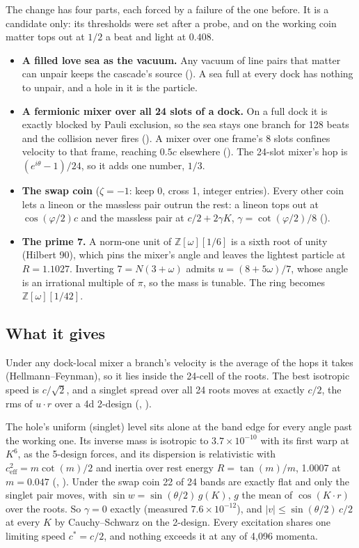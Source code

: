 The change has four parts, each forced by a failure of the one before. It is a candidate only: its thresholds were
set after a probe, and on the working coin matter tops out at $1/2$ a beat and light at $0.408$.
\begin{itemize}
\item \textbf{A filled love sea as the vacuum.} Any vacuum of line pairs that matter can unpair keeps the cascade's
source (). A sea full at every dock has nothing to unpair, and a hole in it is the particle.
\item \textbf{A fermionic mixer over all 24 slots of a dock.} On a full dock it is exactly blocked by Pauli exclusion,
so the sea stays one branch for 128 beats and the collision never fires (). A mixer over one frame's
8 slots confines velocity to that frame, reaching $0.5c$ elsewhere (). The 24-slot mixer's hop is
$(e^{i\theta} - 1)/24$, so it adds one number, $1/3$.
\item \textbf{The swap coin} ($\zeta = -1$: keep 0, cross 1, integer entries). Every other coin lets a lineon or the
massless pair outrun the rest: a lineon tops out at $\cos(\varphi/2)c$ and the massless pair at $c/2 + 2\gamma K$,
$\gamma = \cot(\varphi/2)/8$ ().
\item \textbf{The prime 7.} A norm-one unit of $\mathbb{Z}[\omega][1/6]$ is a sixth root of unity (Hilbert 90), which
pins the mixer's angle and leaves the lightest particle at $R = 1.1027$. Inverting $7 = N(3 + \omega)$ admits
$u = (8 + 5\omega)/7$, whose angle is an irrational multiple of $\pi$, so the mass is tunable. The ring becomes
$\mathbb{Z}[\omega][1/42]$.
\end{itemize}

\subsection{What it gives}

\begin{theorem}
Under any dock-local mixer a branch's velocity is the average of the hops it takes (Hellmann--Feynman), so it lies
inside the 24-cell of the roots. The best isotropic speed is $c/\sqrt2$, and a singlet spread over all 24 roots moves
at exactly $c/2$, the rms of $u \cdot r$ over a 4d 2-design (, ).
\end{theorem}

The hole's uniform (singlet) level sits alone at the band edge for every angle past the working one. Its inverse mass
is isotropic to $3.7 \times 10^{-10}$ with its first warp at $K^6$, as the 5-design forces, and its dispersion is
relativistic with $c_\text{eff}^2 = m \cot(m)/2$ and inertia over rest energy $R = \tan(m)/m$, 1.0007 at $m = 0.047$
(, ). Under the swap coin 22 of 24 bands are exactly flat and only the singlet
pair moves, with $\sin w = \sin(\theta/2)\, g(K)$, $g$ the mean of $\cos(K \cdot r)$ over the roots. So $\gamma = 0$
exactly (measured $7.6 \times 10^{-12}$), and $|v| \le \sin(\theta/2)\, c/2$ at every $K$ by Cauchy--Schwarz on the
2-design. Every excitation shares one limiting speed $c^* = c/2$, and nothing exceeds it at any of 4,096 momenta.

